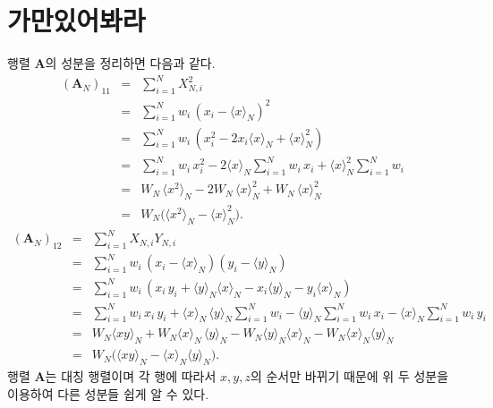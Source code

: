 \documentclass[chapter,a4paper,10pt]{oblivoir}
\begin{document}
\section{가만있어봐라}
행렬 $\mathbf{A}$의 성분을 정리하면 다음과 같다.
\begin{eqnarray}
\left(\mathbf{A}_{N}\right)_{11} &=& \sum_{i=1}^{N} X_{N,i}^2 \\
&=& \sum_{i=1}^{N} w_i\,(x_i - \langle x \rangle_{N})^2\nonumber\\
&=& \sum_{i=1}^{N} w_i\,(x_i^2 -2x_i\langle x \rangle_{N} + \langle x \rangle_{N}^2) \nonumber\\
&=& \sum_{i=1}^{N} w_i\,x_i^2 -2\langle x \rangle_{N}\sum_{i=1}^{N}w_i\,x_i + \langle x \rangle_{N}^2\sum_{i=1}^{N}w_i \nonumber\\
&=& W_{N}\,\langle x^2 \rangle_{N} -2W_{N}\,\langle x \rangle_{N}^2 + W_{N}\,\langle x \rangle_{N}^2 \nonumber\\
&=& W_{N}\Big(\langle x^2 \rangle_{N} -\langle x \rangle_{N}^2\Big). \nonumber
\end{eqnarray}
\begin{eqnarray}
\left(\mathbf{A}_{N}\right)_{12} &=& \sum_{i=1}^{N} X_{N,i}Y_{N,i} \\
&=& \sum_{i=1}^{N} w_i\,(x_i - \langle x \rangle_{N})(y_i - \langle y \rangle_{N})\nonumber\\
&=& \sum_{i=1}^{N} w_i\,(x_i\,y_i + \langle y \rangle_{N}\langle x \rangle_{N} - x_i\langle y \rangle_{N} - y_i\langle x \rangle_{N} )\nonumber\\
&=& \sum_{i=1}^{N} w_i\,x_i\,y_i + \langle x \rangle_{N}\,\langle y \rangle_{N} \sum_{i=1}^{N} w_i - \langle y \rangle_{N} \sum_{i=1}^{N} w_i\,x_i - \langle x \rangle_{N} \sum_{i=1}^{N} w_i\,y_i \nonumber\\
&=& W_{N}\langle xy \rangle_{N}  + W_{N}\langle x \rangle_{N}\,\langle y \rangle_{N} - W_{N}\langle y \rangle_{N} \langle x \rangle_{N} - W_{N}\langle x \rangle_{N} \langle y \rangle_{N}\nonumber\\
&=& W_{N} \Big(\langle xy \rangle_{N} - \langle x \rangle_{N}\langle y \rangle_{N} \Big). \nonumber
\end{eqnarray}
행렬 $\mathbf{A}$는 대칭 행렬이며 각 행에 따라서 $x, y, z$의 순서만 바뀌기 때문에 위 두 성분을 이용하여 다른 성분들 쉽게 알 수 있다.
\end{document}
